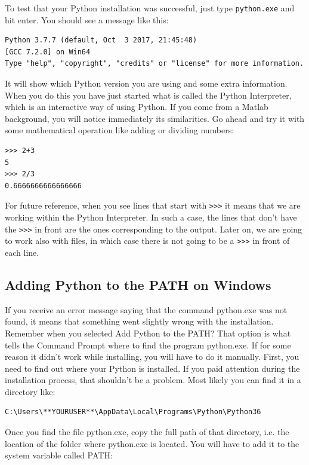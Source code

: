 To test that your Python installation was successful, just type \texttt{python.exe} and hit enter. You should see a message like this:

\begin{verbatim}
Python 3.7.7 (default, Oct  3 2017, 21:45:48)
[GCC 7.2.0] on Win64
Type "help", "copyright", "credits" or "license" for more information.
\end{verbatim}

It will show which Python version you are using and some extra information. When you do this you have just started what is called the Python Interpreter, which is an interactive way of using Python. If you come from a Matlab background, you will notice immediately its similarities. Go ahead and try it with some mathematical operation like adding or dividing numbers:

\begin{verbatim}
>>> 2+3
5
>>> 2/3
0.6666666666666666
\end{verbatim}

For future reference, when you see lines that start with \texttt{>>>} it means that we are working within the Python Interpreter. In such a case, the lines that don’t have the \texttt{>>>} in front are the ones corresponding to the output. Later on, we are going to work also with files, in which case there is not going to be a \texttt{>>>} in front of each line.

\subsection{Adding Python to the PATH on Windows}\label{section:path-windows}
If you receive an error message saying that the command python.exe was not found, it means that something went slightly wrong with the installation. Remember when you selected Add Python to the PATH? That option is what tells the Command Prompt where to find the program python.exe. If for some reason it didn’t work while installing, you will have to do it manually. First, you need to find out where your Python is installed. If you paid attention during the installation process, that shouldn’t be a problem. Most likely you can find it in a directory like:

\begin{verbatim}
C:\Users\**YOURUSER**\AppData\Local\Programs\Python\Python36
\end{verbatim}

Once you find the file python.exe, copy the full path of that directory, i.e. the location of the folder where python.exe is located. You will have to add it to the system variable called PATH:

